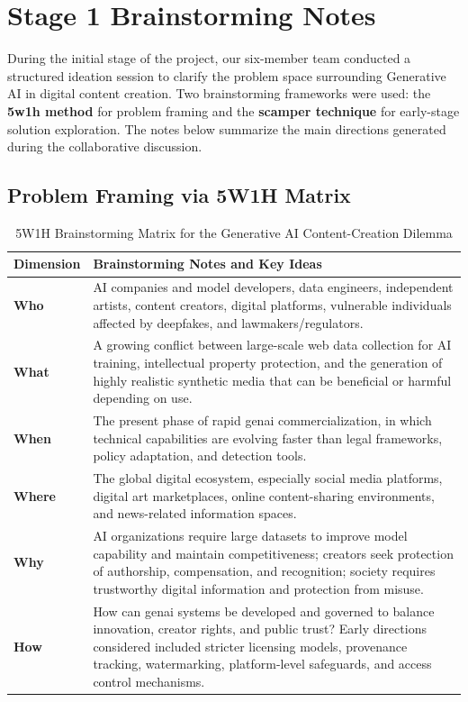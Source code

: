 \section{Stage 1 Brainstorming Notes}\label{app:brainstorming-notes}

During the initial stage of the project, our six-member team conducted a structured ideation session to clarify the problem space surrounding Generative AI in digital content creation. Two brainstorming frameworks were used: the \textbf{\ac{5w1h} method} for problem framing and the \textbf{\ac{scamper} technique} for early-stage solution exploration. The notes below summarize the main directions generated during the collaborative discussion.

\subsection{Problem Framing via 5W1H Matrix}\label{app:5w1h}

\begin{table}[H]
    \centering
    \caption{5W1H Brainstorming Matrix for the Generative AI Content-Creation Dilemma}\label{tab:5w1h}
    \begin{tabularx}{\textwidth}{@{}P{2.2cm}L@{}}
        \toprule
        \textbf{Dimension} & \textbf{Brainstorming Notes and Key Ideas} \\
        \midrule
        \textbf{Who} & AI companies and model developers, data engineers, independent artists, content creators, digital platforms, vulnerable individuals affected by deepfakes, and lawmakers/regulators. \\
        \addlinespace
        \textbf{What} & A growing conflict between large-scale web data collection for AI training, intellectual property protection, and the generation of highly realistic synthetic media that can be beneficial or harmful depending on use. \\
        \addlinespace
        \textbf{When} & The present phase of rapid \ac{genai} commercialization, in which technical capabilities are evolving faster than legal frameworks, policy adaptation, and detection tools. \\
        \addlinespace
        \textbf{Where} & The global digital ecosystem, especially social media platforms, digital art marketplaces, online content-sharing environments, and news-related information spaces. \\
        \addlinespace
        \textbf{Why} & AI organizations require large datasets to improve model capability and maintain competitiveness; creators seek protection of authorship, compensation, and recognition; society requires trustworthy digital information and protection from misuse. \\
        \addlinespace
        \textbf{How} & How can \ac{genai} systems be developed and governed to balance innovation, creator rights, and public trust? Early directions considered included stricter licensing models, provenance tracking, watermarking, platform-level safeguards, and access control mechanisms. \\
        \bottomrule
    \end{tabularx}
\end{table}

